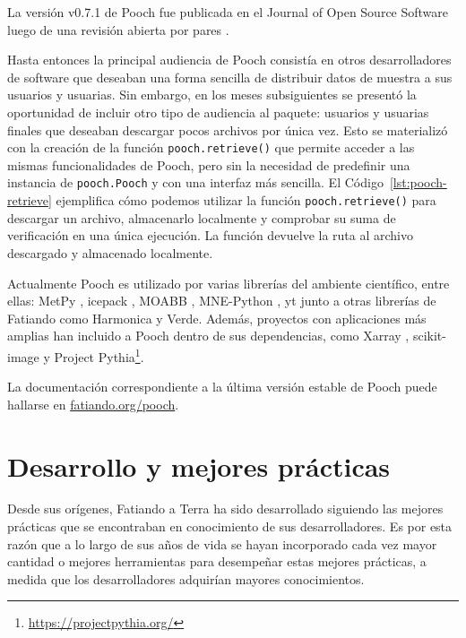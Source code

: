 La versión v0.7.1 de Pooch fue publicada en el Journal of Open Source
Software luego de una revisión abierta por pares \citep{pooch2020}.



Hasta entonces la principal audiencia de Pooch consistía en otros
desarrolladores de software que deseaban una forma sencilla de distribuir datos
de muestra a sus usuarios y usuarias.
Sin embargo, en los meses subsiguientes se presentó la oportunidad de incluir
otro tipo de audiencia al paquete: usuarios y usuarias finales que deseaban
descargar pocos archivos por única vez.
Esto se materializó con la creación de la función \texttt{pooch.retrieve()} que
permite acceder a las mismas funcionalidades de Pooch, pero sin la
necesidad de predefinir una instancia de \texttt{pooch.Pooch} y con una
interfaz más sencilla.
El Código~\ref{lst:pooch-retrieve} ejemplifica cómo podemos utilizar la función
\texttt{pooch.retrieve()} para descargar un archivo, almacenarlo localmente
y comprobar su suma de verificación en una única ejecución.
La función devuelve la ruta al archivo descargado y almacenado localmente.

Actualmente Pooch es utilizado por varias librerías del ambiente
científico, entre ellas: MetPy \citep{metpy}, icepack \citep{icepack}, MOABB
\citep{moabb}, MNE-Python \citep{mnepython}, yt \citep{yt2010} junto a otras
librerías de Fatiando como Harmonica y Verde.
Además, proyectos con aplicaciones más amplias han incluido a Pooch
dentro de sus dependencias, como Xarray \citep{xarray2017}, scikit-image
\citep{skimage} y Project Pythia\footnote{\url{https://projectpythia.org/}}.

La documentación correspondiente a la última versión estable de Pooch
puede hallarse en \href{https://www.fatiando.org/pooch}{fatiando.org/pooch}.


\section{Desarrollo y mejores prácticas}
\label{sec:best-practices}

Desde sus orígenes, Fatiando a Terra ha sido desarrollado siguiendo las mejores
prácticas que se encontraban en conocimiento de sus desarrolladores.
Es por esta razón que a lo largo de sus años de vida se hayan incorporado cada
vez mayor cantidad o mejores herramientas para desempeñar estas mejores
prácticas, a medida que los desarrolladores adquirían mayores conocimientos.

